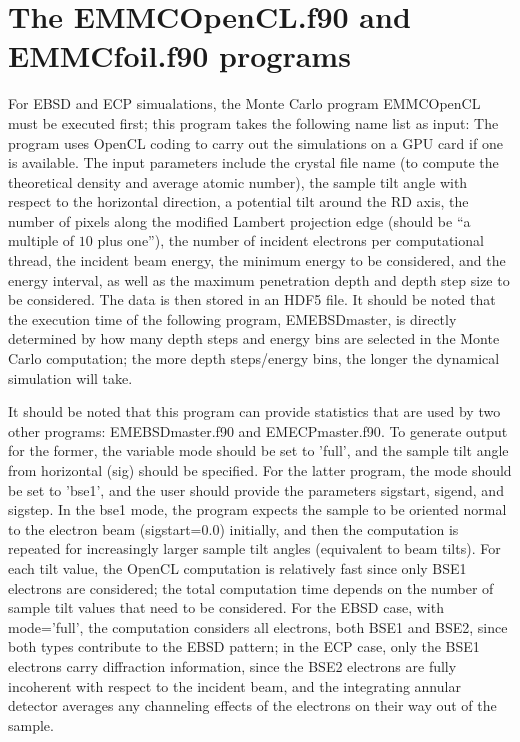 \documentclass[DIV=calc, paper=letter, fontsize=11pt]{scrartcl}	 %
\begin{document}
\section{The \protect\textsf{EMMCOpenCL.f90} and \protect\textsf{EMMCfoil.f90} programs\label{sec:f90MC}}
For EBSD and ECP simualations, the Monte Carlo program \textsf{EMMCOpenCL} must be executed first; this program takes the following name list as input:
The program uses OpenCL coding to carry out the simulations on a GPU card if one is available.  The input parameters
include the crystal file name (to compute the theoretical density and average atomic number), the sample
tilt angle with respect to the horizontal direction, a potential tilt around the \textsf{RD} axis, the number of pixels
along the modified Lambert projection edge (should be ``a multiple of $10$ plus one''), the number of incident electrons per computational thread, 
the incident beam energy, the minimum energy to be considered, and the energy interval,
as well as the maximum penetration depth and depth step size to be considered.  The data is then stored in an 
HDF5 file.  It should be noted that the execution time of the 
following program, \textsf{EMEBSDmaster}, is directly determined by how many depth steps and energy bins are selected in the
Monte Carlo computation; the more depth steps/energy bins, the longer the dynamical simulation will take.

It should be noted that this program can provide statistics that are used by two other programs: \textsf{EMEBSDmaster.f90} and
\textsf{EMECPmaster.f90}.  To generate output for the former, the variable \textsf{mode} should be set to \textsf{'full'}, 
and the sample tilt angle from horizontal (\textsf{sig}) should be specified.  For the latter program, the \textsf{mode} should
be set to \textsf{'bse1'}, and the user should provide the parameters \textsf{sigstart}, \textsf{sigend}, and \textsf{sigstep}.  In the 
bse1 mode, the program expects the sample to be oriented normal to the electron beam (\textsf{sigstart=0.0}) initially, and 
then the computation is repeated for increasingly larger sample tilt angles (equivalent to beam tilts).  For each tilt value, the 
OpenCL computation is relatively fast since only BSE1 electrons are considered; the total computation time depends on the 
number of sample tilt values that need to be considered.  For the EBSD case, with \textsf{mode='full'}, the computation 
considers all electrons, both BSE1 and BSE2, since both types contribute to the EBSD pattern; in the ECP case, only the 
BSE1 electrons carry diffraction information, since the BSE2 electrons are fully incoherent with respect to the incident beam,
and the integrating annular detector averages any channeling effects of the electrons on their way out of the sample.
\end{document}
